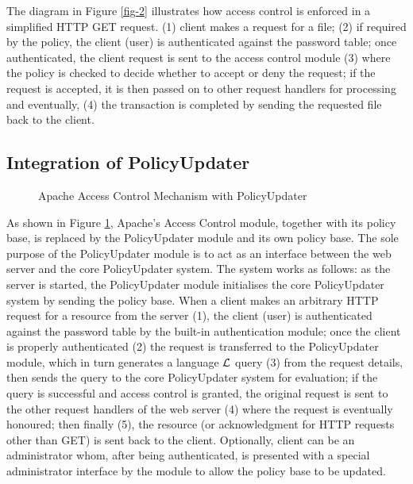 \documentclass[11pt]{llncs}
\begin{document}
    The diagram in Figure \ref{fig-2} illustrates how access control is
    enforced in a simplified HTTP GET request. (1) client makes a request for a
    file; (2) if required by the policy, the client (user) is authenticated
    against the password table; once authenticated, the client request is sent
    to the access control module (3) where the policy is checked to decide
    whether to accept or deny the request; if the request is accepted, it is
    then passed on to other request handlers for processing and eventually,
    (4) the transaction is completed by sending the requested file back to
    the client.

    \subsection{Integration of PolicyUpdater}

      \begin{figure}[ht]
        \begin{center}
          \caption{Apache Access Control Mechanism with PolicyUpdater}
          \label{fig-3}
        \end{center}
      \end{figure}

      As shown in Figure \ref{fig-3}, Apache's Access Control module, together
      with its policy base, is replaced by the PolicyUpdater module and its own
      policy base. The sole purpose of the PolicyUpdater module is to act as an
      interface between the web server and the core PolicyUpdater system. The
      system works as follows: as the server is started, the PolicyUpdater
      module initialises the core PolicyUpdater system by sending the policy
      base. When a client makes an arbitrary HTTP request for a resource from
      the server (1), the client (user) is authenticated against the password
      table by the built-in authentication module; once the client is properly
      authenticated (2) the request is transferred to the PolicyUpdater module,
      which in turn generates a language ${\cal L}$ query (3) from the request
      details, then sends the query to the core PolicyUpdater system for
      evaluation; if the query is successful and access control is granted,
      the original request is sent to the other request handlers of the web
      server (4) where the request is eventually honoured; then finally (5),
      the resource (or acknowledgment for HTTP requests other than GET) is sent
      back to the client. Optionally, client can be an administrator whom,
      after being authenticated, is presented with a special administrator
      interface by the module to allow the policy base to be updated.
\end{document}
